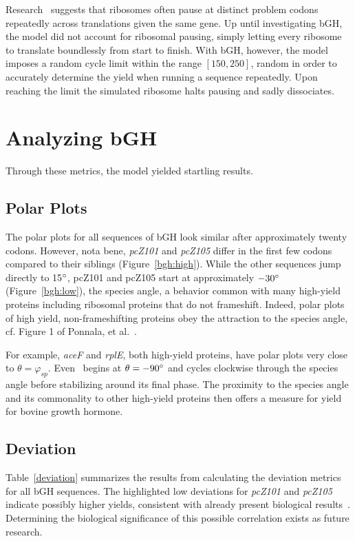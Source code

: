 \documentclass[10pt,twocolumn]{article}
\begin{document}
Research~\cite{gowri:pause} suggests that ribosomes often pause at distinct problem codons repeatedly
across translations given the same gene. Up until investigating bGH, the model did not
account for ribosomal pausing, simply letting every ribosome to translate boundlessly from start to finish. With
bGH, however, the model imposes a random cycle limit within the range $[150,250]$, random in order to accurately
determine the yield when running a sequence repeatedly. Upon reaching the limit the simulated ribosome
halts pausing and sadly dissociates.

\section{Analyzing bGH}

Through these metrics, the model yielded startling results.

\subsection{Polar Plots}

The polar plots for all sequences of bGH look similar after approximately twenty codons.  
However, nota bene, \emph{pcZ101} and \emph{pcZ105} differ in the first few codons compared to
their siblings (Figure~\ref{bgh:high}).
While the other sequences jump directly to 15$^\circ$, pcZ101 and pcZ105 start at approximately $-30^\circ$
(Figure~\ref{bgh:low}),
the species angle, a behavior common with many high-yield proteins including ribosomal proteins that do not
frameshift. Indeed, polar plots of high yield, non-frameshifting proteins obey the attraction to the species
angle, cf. Figure 1 of Ponnala, et al.~\cite{lalit:mechanics}.

For example, \emph{aceF} and \emph{rplE}, both high-yield proteins, have polar plots very close to $\theta = \varphi_{sp}$.
Even \prfB\ begins at $\theta = -90^\circ$ and cycles clockwise through the species angle before
stabilizing around its final phase. The proximity to the species angle and its commonality to
other high-yield proteins then offers a measure for yield for bovine growth hormone.


\subsection{Deviation}

Table~\ref{deviation} summarizes the results from calculating the deviation metrics 
for all bGH sequences. The highlighted low deviations for \emph{pcZ101} and {\it pcZ105}
indicate possibly higher yields, consistent with already present biological results~\cite{schoner:bgh}.
Determining the biological significance of this possible correlation exists as future research.
\end{document}

